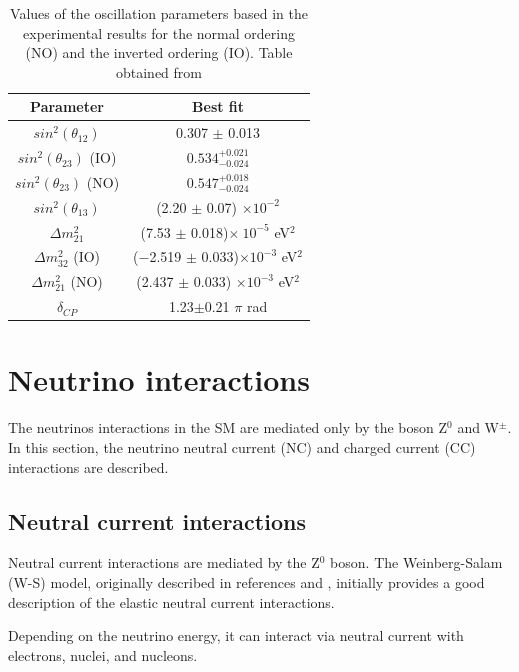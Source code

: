 \begin{table}[!htb]
    \centering
    \begin{tabular}{c|c}
        Parameter & Best fit \\ \hline
        $sin^2(\theta_{12})$ & 0.307 $\pm$ 0.013 \\ \hline
        $sin^2(\theta_{23})$ (IO) & $0.534^{+0.021}_{-0.024}$ \\ \hline
        $sin^2(\theta_{23})$ (NO) & $0.547^{+0.018}_{-0.024}$  \\ \hline
        $sin^2(\theta_{13})$ & (2.20 $\pm$ 0.07) $\times10^{−2}$ \\ \hline
        $\Delta m^2_{21}$ & (7.53 $\pm$ 0.018)$ \times\ 10^{-5}$ eV$^2$ \\ \hline
        $\Delta m^2_{32}$ (IO) &  (−2.519 $\pm$ 0.033)$\times10^{−3}$ eV$^2$ \\ \hline
        $\Delta m^2_{21}$ (NO) & (2.437 $\pm$ 0.033) $\times10^{−3}$ eV$^2$ \\ \hline
        $\delta_{CP}$ & 1.23$\pm$0.21 $\pi$ rad\\
    \end{tabular}
    \caption{Values of the oscillation parameters based in the experimental results for the normal ordering (NO) and the inverted ordering (IO). Table obtained from \cite{Workman:2022ynf}}
    \label{tab:Cap1:OscillationParameters}
\end{table}

\section{Neutrino interactions}
\label{Cap:Int:NuInteractions}

The neutrinos interactions in the SM are mediated only by the boson Z$^0$ and W$^{\pm}$. In this section, the neutrino neutral current (NC) and charged current (CC) interactions are described.

\subsection{Neutral current interactions}
\label{Cap:Int:NuInteractions:NC}

Neutral current interactions are mediated by the Z$^0$ boson. The Weinberg-Salam (W-S) model, originally described in references \cite{PhysRevLett.19.1264} and \cite{Salam1959}, initially provides a good description of the elastic neutral current interactions.

Depending on the neutrino energy, it can interact via neutral current with electrons, nuclei, and nucleons.

